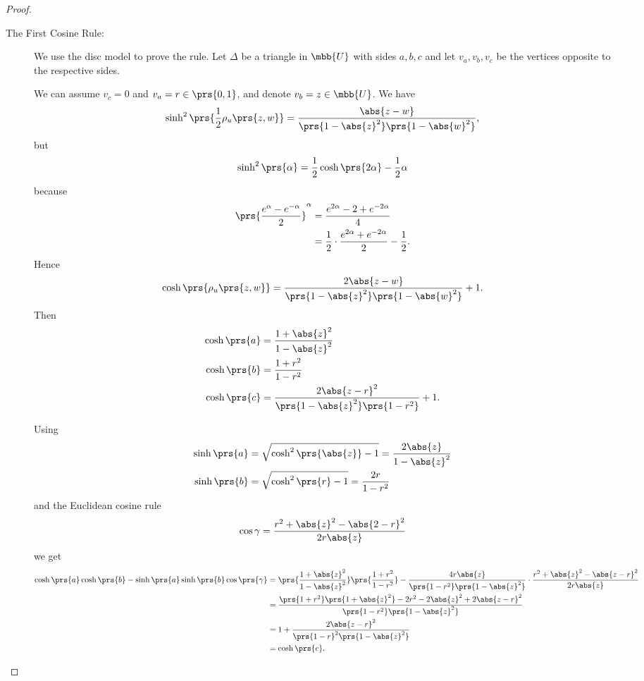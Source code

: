 \documentclass[10pt, twoside]{book}
\begin{document}
\begin{proof}
\begin{description}
\item[The First Cosine Rule:]
We use the disc model to prove the rule. Let $\Delta$ be a triangle in $\mbb{U}$ with sides $a,b,c$ and let $v_a, v_b, v_c$ be the vertices opposite to the respective sides.

We can assume $v_c = 0$ and $v_a = r \in \prs{0,1}$, and denote $v_b = z \in \mbb{U}$.
We have
\[\sinh^2 \prs{\frac{1}{2} \rho_u\prs{z,w}} = \frac{\abs{z-w}}{\prs{1-\abs{z}^2} \prs{1-\abs{w}^2}} \text{,}\]
but
\[\sinh^2\prs{\alpha} = \frac{1}{2} \cosh\prs{2 \alpha} - \frac{1}{2} \alpha\]
because
\begin{align*}
\prs{\frac{e^{\alpha} - e^{-\alpha}}{2}}^\alpha
&= \frac{e^{2 \alpha} - 2 + e^{-2 \alpha}}{4}
\\&= \frac{1}{2} \cdot \frac{e^{2 \alpha} + e^{-2 \alpha}}{2} - \frac{1}{2} \text{.}
\end{align*}
Hence
\[\cosh\prs{\rho_u\prs{z,w}} = \frac{2 \abs{z-w}}{\prs{1-\abs{z}^2} \prs{1-\abs{w}^2}} + 1 \text{.}\]
Then
\begin{align*}
\cosh\prs{a} &= \frac{1 + \abs{z}^2}{1 - \abs{z}^2} \\
\cosh\prs{b} &= \frac{1+r^2}{1-r^2} \\
\cosh\prs{c} &= \frac{2 \abs{z-r}^2}{\prs{1-\abs{z}^2}\prs{1-r^2}} + 1 \text{.}
\end{align*}

Using
\begin{align*}
\sinh\prs{a} &= \sqrt{\cosh^2\prs{\abs{z}} - 1} = \frac{2 \abs{z}}{1 - \abs{z}^2} \\
\sinh\prs{b} &= \sqrt{\cosh^2\prs{r} - 1} = \frac{2r}{1-r^2}
\end{align*}
and the Euclidean cosine rule
\[\cos \gamma = \frac{r^2 + \abs{z}^2 - \abs{2-r}^2}{2r \abs{z}}\]
we get
\begin{align*}
\cosh\prs{a} \cosh\prs{b} - \sinh\prs{a} \sinh\prs{b} \cos\prs{\gamma}
&=
\prs{\frac{1 + \abs{z}^2}{1-\abs{z}^2}} \prs{\frac{1 + r^2}{1-r^2}} - \frac{4r \abs{z}}{\prs{1-r^2}\prs{1-\abs{z}^2}} \cdot \frac{r^2 + \abs{z}^2 - \abs{z-r}^2}{2 r \abs{z}}
\\&=
\frac{\prs{1+r^2}\prs{1+\abs{z}^2} - 2r^2 - 2\abs{z}^2 + 2\abs{z-r}^2}{\prs{1-r^2}\prs{1-\abs{z}^2}}
\\&=
1 + \frac{2 \abs{z-r}^2}{\prs{1-r}^2 \prs{1-\abs{z}^2}}
\\&=
\cosh\prs{c} \text{.}
\end{align*}


\end{description}
\end{proof}
\end{document}
